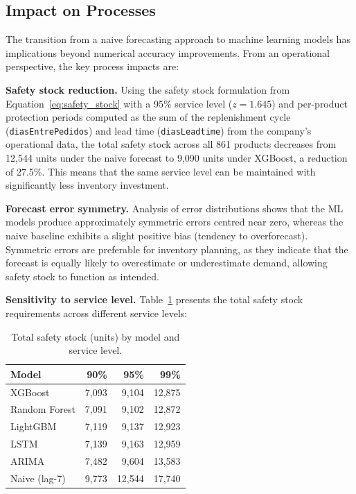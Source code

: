 \subsection{Impact on Processes}

The transition from a naive forecasting approach to machine learning models has implications beyond numerical accuracy improvements. From an operational perspective, the key process impacts are:

\textbf{Safety stock reduction.} Using the safety stock formulation from Equation~\ref{eq:safety_stock} with a 95\% service level ($z = 1.645$) and per-product protection periods computed as the sum of the replenishment cycle (\texttt{diasEntrePedidos}) and lead time (\texttt{diasLeadtime}) from the company's operational data, the total safety stock across all 861 products decreases from 12,544 units under the naive forecast to 9,090 units under XGBoost, a reduction of 27.5\%. This means that the same service level can be maintained with significantly less inventory investment.

\textbf{Forecast error symmetry.} Analysis of error distributions shows that the ML models produce approximately symmetric errors centred near zero, whereas the naive baseline exhibits a slight positive bias (tendency to overforecast). Symmetric errors are preferable for inventory planning, as they indicate that the forecast is equally likely to overestimate or underestimate demand, allowing safety stock to function as intended.

\textbf{Sensitivity to service level.} Table~\ref{tab:sensitivity} presents the total safety stock requirements across different service levels:

\begin{table}[H]
\centering
\small
\caption{Total safety stock (units) by model and service level.}
\label{tab:sensitivity}
\begin{tabular}{|l|r|r|r|}
\hline
\textbf{Model} & \textbf{90\%} & \textbf{95\%} & \textbf{99\%} \\
\hline
XGBoost & 7,093 & 9,104 & 12,875 \\
Random Forest & 7,091 & 9,102 & 12,872 \\
LightGBM & 7,119 & 9,137 & 12,923 \\
LSTM & 7,139 & 9,163 & 12,959 \\
ARIMA & 7,482 & 9,604 & 13,583 \\
Naive (lag-7) & 9,773 & 12,544 & 17,740 \\
\hline
\end{tabular}
\end{table}

